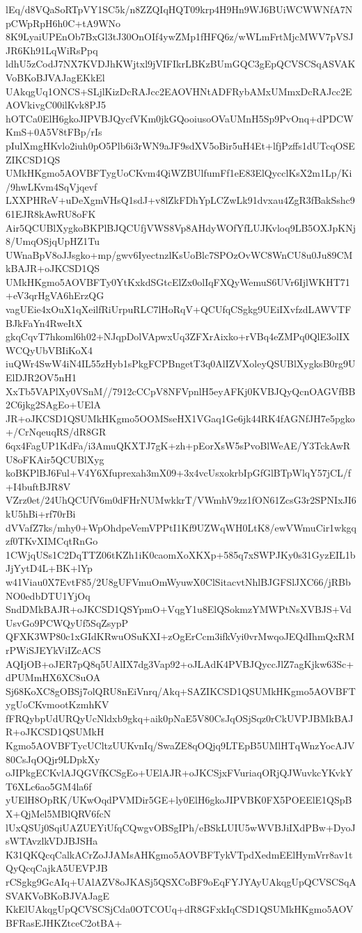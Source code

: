 lEq/d8VQaSoRTpVY1SC5k/n8ZZQIqHQT09krp4H9Hn9WJ6BUiWCWWNfA7NpCWpRpH6h0C+tA9WNo
8K9LyaiUPEnOb7BxGl3tJ30OnOIf4ywZMp1fHFQ6z/wWLmFrtMjcMWV7pVSJJR6Kh91LqWiRsPpq
ldhU5zCodJ7NX7KVDJhKWjtxl9jVIFIkrLBKzBUmGQC3gEpQCVSCSqASVAKVoBKoBJVAJagEKkEl
UAkqgUq1ONCS+SLjlKizDcRAJcc2EAOVHNtADFRybAMxUMmxDcRAJcc2EAOVkivgC00ilKvk8PJ5
hOTCa0ElH6gkoJIPVBJQycfVKm0jkGQooiusoOVaUMnH5Sp9PvOnq+dPDCWKmS+0A5V8tFBp/rIs
pIulXmgHKvlo2iuh0pO5Plb6i3rWN9aJF9sdXV5oBir5uH4Et+lfjPzffs1dUTcqOSEZIKCSD1QS
UMkHKgmo5AOVBFTygUoCKvm4QiWZBUlfumFf1eE83ElQycclKsX2m1Lp/Ki/9hwLKvm4SqVjqevf
LXXPHReV+uDeXgmVHsQ1sdJ+v8lZkFDhYpLCZwLk91dvxau4ZgR3fBakSshc961EJR8kAwRU8oFK
Air5QCUBlXygkoBKPlBJQCUfjVWS8Vp8AHdyWOfYfLUJKvloq9LB5OXJpKNj8/UmqOSjqUpHZ1Tu
UWnaBpV8oJJsgko+mp/gwv6IyectnzlKsUoBlc7SPOzOvWC8WnCU8u0Ju89CMkBAJR+oJKCSD1QS
UMkHKgmo5AOVBFTy0YtKxkdSGtcElZx0olIqFXQyWemuS6UVr6IjlWKHT71+eV3qrHgVA6hErzQG
vagUEie4xOuX1qXeilfRiUrpuRLC7lHoRqV+QCUfqCSgkg9UEiIXvfzdLAWVTFBJkFaYn4RweItX
gkqCqvT7hkoml6h02+NJqpDolVApwxUq3ZFXrAixko+rVBq4eZMPq0QlE3olIXWCQyUbVBIiKoX4
iuQWr4SwW4iN4IL55zHyb1sPkgFCPBngetT3q0AlIZVXoleyQSUBlXygksB0rg9UElDJR2OV5nH1
XxTb5VAPlXy0VSnM//7912cCCpV8NFVpnlH5eyAFKj0KVBJQyQcnOAGVfBB2C6jkg2SAgEo+UElA
JR+oJKCSD1QSUMkHKgmo5OOMSseHX1VGaq1Ge6jk44RK4fAGNfJH7e5pgko+/CrNqeuqRS/dR8GR
6qx4FagUP1KdFa/i3AmuQKXTJ7gK+zh+pEorXsW5sPvoBlWeAE/Y3TckAwRU8oFKAir5QCUBlXyg
koBKPlBJ6Ful+V4Y6Xfuprexah3mX09+3x4vcUsxokrbIpGfGlBTpWlqY57jCL/f+I4buftBJR8V
VZrz0et/24UhQCUfV6m0dFHrNUMwkkrT/VWmhV9zz1fON61ZcsG3r2SPNIxJI6kU5hBi+rf70rBi
dVVafZ7ks/mhy0+WpOhdpeVemVPPtI1Kf9UZWqWH0LtK8/ewVWmuCir1wkgqzf0TKvXIMCqtRnGo
1CWjqUSs1C2DqTTZ06tKZh1iK0caomXoXKXp+585q7xSWPJKy0s31GyzEIL1bJjYytD4L+BK+lYp
w41Viau0X7EvtF85/2U8gUFVmuOmWyuwX0ClSitacvtNhlBJGFSlJXC66/jRBbNO0edbDTU1YjOq
SndDMkBAJR+oJKCSD1QSYpmO+VqgY1u8ElQSokmzYMWPtNsXVBJS+VdUsvGo9PCWQyUf5SqZsypP
QFXK3WP80c1xGIdKRwuOSuKXI+zOgErCcm3ifkVyi0vrMwqoJEQdIhmQxRMrPWiSJEYkViIZcACS
AQIjOB+oJER7pQ8q5UAlIX7dg3Vap92+oJLAdK4PVBJQyccJlZ7agKjkw63Sc+dPUMmHX6XC8uOA
Sj68KoXC8gOBSj7olQRU8nEiVnrq/Akq+SAZIKCSD1QSUMkHKgmo5AOVBFTygUoCKvmootKzmhKV
fFRQybpUdURQyUcNldxb9gkq+aik0pNaE5V80CsJqOSjSqz0rCkUVPJBMkBAJR+oJKCSD1QSUMkH
Kgmo5AOVBFTycUCltzUUKvnIq/SwaZE8qOQjq9LTEpB5UMlHTqWnzYocAJV80CsJqOQjr9LDpkXy
oJIPkgECKvlAJQGVfKCSgEo+UElAJR+oJKCSjxFVuriaqORjQJWuvkcYKvkYT6XLc6ao5GM4la6f
yUElH8OpRK/UKwOqdPVMDir5GE+ly0ElH6gkoJIPVBK0FX5POEElE1QSpBX+QjMel5MBlQRV6fcN
lUxQSUj0SqiUAZUEYiUfqCQwgvOBSgIPh/eBSkLUIU5wWVBJiIXdPBw+DyoJsWTAvzlkVDJBJSHa
K31QKQcqCalkACrZoJJAMsAHKgmo5AOVBFTykVTpdXedmEElHymVrr8av1tQyQcqCajkA5UEVPJB
rCSgkg9GcAIq+UAlAZV8oJKASj5QSXCoBF9oEqFYJYAyUAkqgUpQCVSCSqASVAKVoBKoBJVAJagE
KkElUAkqgUpQCVSCSjCda0OTCOUq+dR8GFxkIqCSD1QSUMkHKgmo5AOVBFRasEJHKZtceC2otBA+
